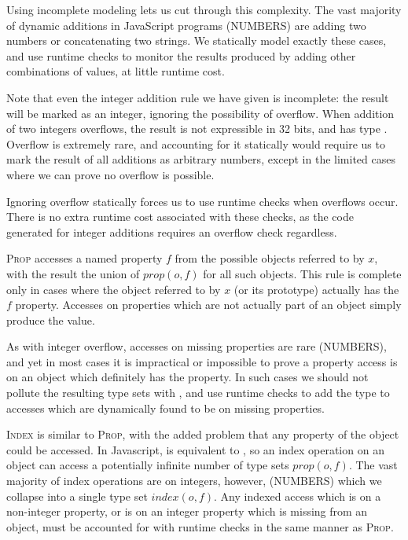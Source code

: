 Using incomplete modeling lets us cut through this complexity. The vast
majority of dynamic additions in JavaScript programs (NUMBERS) are adding two
numbers or concatenating two strings. We statically model exactly these cases,
and use runtime checks to monitor the results produced by adding other
combinations of values, at little runtime cost.

Note that even the integer addition rule we have given is incomplete: the
result will be marked as an integer, ignoring the possibility of
overflow. When addition of two integers overflows, the result is not
expressible in 32 bits, and has type . Overflow is extremely
rare, and accounting for it statically would require us to mark the result of
all additions as arbitrary numbers, except in the limited cases where we can
prove no overflow is possible.

Ignoring overflow statically forces us to use runtime checks when overflows
occur. There is no extra runtime cost associated with these checks, as the
code generated for integer additions requires an overflow check regardless.

\textsc{Prop} accesses a named property $f$ from the possible objects
referred to by $x$,
with the result the union of $prop(o,f)$ for all such objects.
This rule is complete only in cases where the object referred to by $x$
(or its prototype) actually has the $f$ property.
Accesses on properties which are not actually part of an object simply
produce the  value.

As with integer overflow, accesses on missing properties are rare
(NUMBERS), and yet in most cases it is impractical or impossible
to prove a property access is on an object which definitely has the
property. In such cases we should not pollute the resulting type
sets with , and use runtime checks to add the 
type to accesses which are dynamically found to be on missing properties.

\textsc{Index} is similar to \textsc{Prop}, with the added problem
that any property of the object could be accessed.
In Javascript,  is equivalent to , so an index
operation on an object can access a potentially
infinite number of type sets $prop(o,f)$.
The vast majority of index operations are on integers, however, (NUMBERS)
which we collapse into a single type set $index(o,f)$.
Any indexed access which is on a non-integer property, or is on an
integer property which is missing from an object,
must be accounted for with runtime checks in the same manner as \textsc{Prop}.

